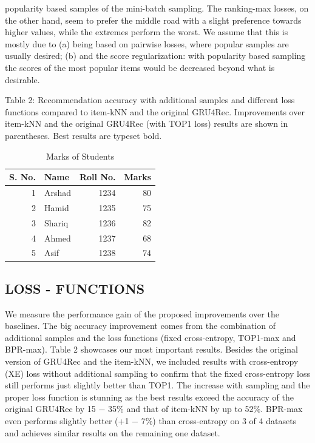 popularity based samples of the mini-batch sampling. The ranking-max losses, on the other hand, seem to prefer the middle road with a slight preference towards higher values, while the extremes perform the worst. We assume that this is mostly due to (a) being based on pairwise losses, where popular samples are usually desired; (b) and the score regularization: with popularity based sampling the scores of the most popular items would be decreased beyond what is desirable.

Table 2: Recommendation accuracy with additional samples and different loss functions compared to item-kNN and the original GRU4Rec. Improvements over item-kNN and the original GRU4Rec (with TOP1 loss) results are shown in parentheses. Best results are typeset bold.


\begin{table}[htbp]
  \centering
  \caption{Marks of Students}
    \begin{tabular}{|r|l|r|r|}
		\hline
    S. No. &Name& Roll No. &Marks \\
		\hline
    1     & Arshad & 1234  & 80 \\
    2     & Hamid & 1235  & 75 \\
    3     & Shariq & 1236  & 82 \\
    4     & Ahmed & 1237  & 68 \\
    5     & Asif  & 1238  & 74 \\
		\hline
		\hline
    \end{tabular}%
  \label{tab:addlabel}%
\end{table}%

\label{headings}


\subsection{LOSS - FUNCTIONS}

We measure the performance gain of the proposed improvements over the baselines. The big accuracy improvement comes from the combination of additional samples and the loss functions (fixed cross-entropy, TOP1-max and BPR-max). Table 2 showcases our most important results. Besides the original version of GRU4Rec and the item-kNN, we included results with cross-entropy (XE) loss without additional sampling to confirm that the fixed cross-entropy loss still performs just slightly better than TOP1. The increase with sampling and the proper loss function is stunning as the best results exceed the accuracy of the original GRU4Rec by 15 − 35\% and that of item-kNN by up to 52\%. BPR-max even performs slightly better (+1 − 7\%) than cross-entropy on 3 of 4 datasets and achieves similar results on the remaining one dataset.

